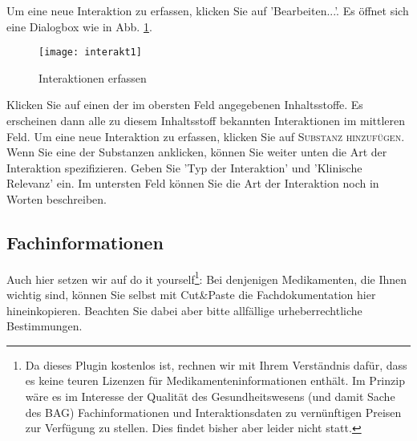 \documentclass[a4paper]{scrartcl}
\begin{document}
Um eine neue Interaktion zu erfassen, klicken Sie auf 'Bearbeiten...'. Es öffnet sich eine Dialogbox wie in Abb. \ref{fig:baginterakt}.
\begin{figure}[ht]
    \begin{centering}
    \texttt{[image: interakt1]}
    \caption{Interaktionen erfassen}
    \label {fig:baginterakt}
    \end{centering}
\end{figure}
Klicken Sie auf einen der im obersten Feld angegebenen Inhaltsstoffe. Es erscheinen dann alle zu diesem Inhaltsstoff bekannten Interaktionen im mittleren Feld. Um eine neue Interaktion zu erfassen, klicken Sie auf \textsc{Substanz hinzufügen}. Wenn Sie eine der Substanzen anklicken, können Sie weiter unten die Art der Interaktion spezifizieren. Geben Sie 'Typ der Interaktion' und 'Klinische Relevanz' ein. Im untersten Feld können Sie die Art der Interaktion noch in Worten beschreiben.

\subsection{Fachinformationen}
Auch hier setzen wir auf \glqq{}do it yourself\grqq{}\footnote{Da dieses Plugin kostenlos ist, rechnen wir mit Ihrem Verständnis dafür, dass es keine teuren Lizenzen für Medikamenteninformationen enthält. Im Prinzip wäre es im Interesse der Qualität des Gesundheitswesens (und damit Sache des BAG) Fachinformationen und Interaktionsdaten zu vernünftigen Preisen zur Verfügung zu stellen. Dies findet bisher aber leider nicht statt.}: Bei denjenigen Medikamenten, die Ihnen wichtig sind, können Sie selbst mit Cut\&Paste die Fachdokumentation hier hineinkopieren. Beachten Sie dabei aber bitte allfällige urheberrechtliche Bestimmungen.
\end{document}
